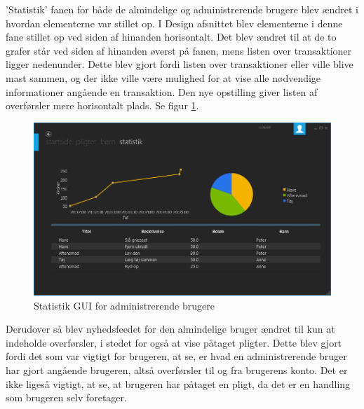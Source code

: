 ’Statistik’ fanen for både de almindelige og administrerende brugere blev ændret i hvordan elementerne var stillet op. I Design afsnittet blev elementerne i denne fane stillet op ved siden af hinanden horisontalt. Det blev ændret til at de to grafer står ved siden af hinanden øverst på fanen, mens listen over transaktioner ligger nedenunder. Dette blev gjort fordi listen over transaktioner eller ville blive mast sammen, og der ikke ville være mulighed for at vise alle nødvendige informationer angående en transaktion. Den nye opstilling giver listen af overførsler mere horisontalt plads. Se figur \ref{AdminStatistic}.

\begin{figure}[H]
\centering
\includegraphics[width=1\textwidth]{Billeder/AdminStatisticGUI.png}
\caption{Statistik GUI for administrerende brugere}
\label{AdminStatistic}
\end{figure}

Derudover så blev nyhedsfeedet for den almindelige bruger ændret til kun at indeholde overførsler, i stedet for også at vise påtaget pligter. Dette blev gjort fordi det som var vigtigt for brugeren, at se, er hvad en administrerende bruger har gjort angående brugeren, altså overførsler til og fra brugerens konto. Det er ikke ligeså vigtigt, at se, at brugeren har påtaget en pligt, da det er en handling som brugeren selv foretager.